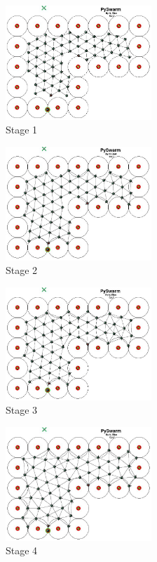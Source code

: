 \documentclass[10pt,journal,letterpaper,twoside]{IEEEtran}
\begin{document}
\begin{figure}
\begin{center}
\includegraphics[width=5.5cm]{figures/EXPAND1}
\end{center}
\caption{Stage 1\label{emerge:Expand1}}
\end{figure}

\begin{figure}
\begin{center}
\includegraphics[width=5.5cm]{figures/EXPAND2}
\end{center}
\caption{Stage 2\label{emerge:Expand2}}
\end{figure}

\begin{figure}
\begin{center}
\includegraphics[width=5.5cm]{figures/EXPAND3}
\end{center}
\caption{Stage 3\label{emerge:Expand3}}
\end{figure}

\begin{figure}
\begin{center}
\includegraphics[width=5.5cm]{figures/EXPAND4}
\end{center}
\caption{Stage 4\label{emerge:Expand4}}
\end{figure}
\end{document}
